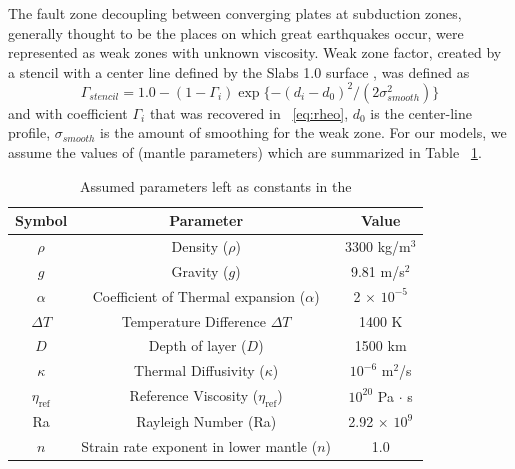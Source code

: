 \documentclass[12pt]{article}
\begin{document}
The fault zone decoupling between converging plates at subduction zones, generally thought to be the places on which great earthquakes occur, were represented as weak zones with unknown viscosity. Weak zone factor, created by a stencil with a center line defined by the Slabs 1.0 surface \citep{Hayes2012}, was defined as
\begin{equation}
\Gamma_{stencil} = 1.0 - (1-\Gamma_i)\exp\{-(d_i-d_0)^2/(2\sigma_{smooth}^2)\}
\end{equation}
and with coefficient $\Gamma_i$ that was recovered in ~\eqref{eq:rheo}, $d_0$ is the center-line profile, $\sigma_{smooth}$ is the amount of smoothing for the weak zone.
 For our models, we assume the values of (mantle parameters) which are summarized in Table ~\ref{table:parameters}.

\begin{table}[H]
  \caption{Assumed parameters left as constants in the }
  \centering  %
  \begin{tabular}{c c c} %
    \hline \hline                        %
    Symbol & Parameter & Value  \\ [0.5ex] %
    \hline                  %
    $\rho$ & Density ($\rho$)  & 3300 kg/m$^3$ \\
    $g$ & Gravity ($g$) & 9.81 m/s$^2$ \\
    $\alpha$ & Coefficient of Thermal expansion ($\alpha$) & 2 $\times$ $10^{-5}$ \\ 
    $\Delta T$& Temperature Difference $\Delta T$ & 1400 K \\
    $D$& Depth of layer ($D$) & 1500 km \\
    $\kappa$& Thermal Diffusivity ($\kappa$) & $10^{-6}$  m$^2$/s \\
    $\eta_{\text{ref}}$& Reference Viscosity  ($\eta_{\text{ref}}$) & $10^{20}$ Pa $\cdot$ s \\
    Ra & Rayleigh Number (Ra) & 2.92 $\times$ $10^9$ \\
    $n$ & Strain rate exponent in lower mantle ($n$) & 1.0 \\
    \hline %
  \end{tabular}
  \label{table:parameters} %
\end{table}
\end{document}
